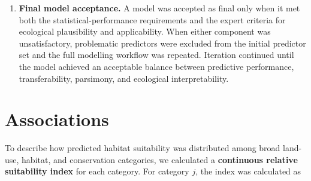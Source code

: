 \documentclass[
  openany]{book}
\let\OldTexttt\texttt
\renewcommand{\texttt}[1]{%
  \OldTexttt{\small #1}%
}
\begin{document}
\begin{enumerate}
\begin{itemize}
    \begin{itemize}
    \item
      \texttt{0}: \textbf{Not applicable.} The model is considered unreliable and should not be used for conservation applications.
    \item
      \texttt{1}: \textbf{Very limited applicability.} The habitat-suitability map may be used mainly to guide field surveys intended to collect additional occurrence or abundance data for subsequent model improvement.
    \item
      \texttt{2}: \textbf{Limited applicability.} The map may be used with substantially reduced weight in multi-species conservation prioritisation.
    \item
      \texttt{3}: \textbf{Moderate applicability.} The habitat-suitability map is generally useful, but clear artefacts or questionable areas remain and should be considered when interpreting prioritisation results.
    \item
      \texttt{4}: \textbf{High applicability.} The habitat-suitability map is suitable for species-conservation planning, but ecological interpretation should also draw on the response functions rather than relying on the map alone.
    \item
      \texttt{5}: \textbf{Very high applicability.} Both the habitat-suitability map and the response functions are highly informative and may be used for species-conservation planning and scenario modelling.
    \end{itemize}
  \end{itemize}
\item
  \textbf{Final model acceptance.} A model was accepted as final only when it met both the statistical-performance requirements and the expert criteria for ecological plausibility and applicability. When either component was unsatisfactory, problematic predictors were excluded from the initial predictor set and the full modelling workflow was repeated. Iteration continued until the model achieved an acceptable balance between predictive performance, transferability, parsimony, and ecological interpretability.
\end{enumerate}

\section{Associations}\label{associations}

To describe how predicted habitat suitability was distributed among broad land-use, habitat, and conservation categories, we calculated a \textbf{continuous relative suitability index} for each category. For category \(j\), the index was calculated as
\end{document}
